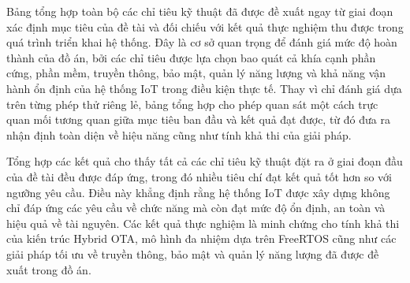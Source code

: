 Bảng tổng hợp toàn bộ các chỉ tiêu kỹ thuật đã được đề xuất ngay từ giai đoạn xác định mục tiêu của đề tài và đối chiếu với kết quả thực nghiệm thu được trong quá trình triển khai hệ thống. Đây là cơ sở quan trọng để đánh giá mức độ hoàn thành của đồ án, bởi các chỉ tiêu được lựa chọn bao quát cả khía cạnh phần cứng, phần mềm, truyền thông, bảo mật, quản lý năng lượng và khả năng vận hành ổn định của hệ thống IoT trong điều kiện thực tế. Thay vì chỉ đánh giá dựa trên từng phép thử riêng lẻ, bảng tổng hợp cho phép quan sát một cách trực quan mối tương quan giữa mục tiêu ban đầu và kết quả đạt được, từ đó đưa ra nhận định toàn diện về hiệu năng cũng như tính khả thi của giải pháp.

Tổng hợp các kết quả cho thấy tất cả các chỉ tiêu kỹ thuật đặt ra ở giai đoạn đầu của đề tài đều được đáp ứng, trong đó nhiều tiêu chí đạt kết quả tốt hơn so với ngưỡng yêu cầu. Điều này khẳng định rằng hệ thống IoT được xây dựng không chỉ đáp ứng các yêu cầu về chức năng mà còn đạt mức độ ổn định, an toàn và hiệu quả về tài nguyên. Các kết quả thực nghiệm là minh chứng cho tính khả thi của kiến trúc Hybrid OTA, mô hình đa nhiệm dựa trên FreeRTOS cũng như các giải pháp tối ưu về truyền thông, bảo mật và quản lý năng lượng đã được đề xuất trong đồ án.
